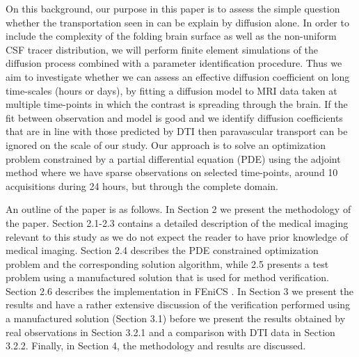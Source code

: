 \documentclass[12pt,a4paper]{article}
\begin{document}
On this background, our purpose in this paper is to assess the simple question whether the  
transportation seen in \cite{ringstad2018brain} can be explain by diffusion alone. In order
to include the complexity of the folding brain surface as well as the non-uniform CSF tracer distribution, we
will perform finite element simulations of the diffusion process combined with a parameter identification procedure. 
Thus we aim to investigate whether we can assess an effective diffusion coefficient on long time-scales (hours or days), by fitting a diffusion model to MRI data taken at multiple time-points in which the contrast is spreading through the brain. If the fit between observation and model is good and we identify diffusion coefficients that are 
in line with those predicted by DTI then paravascular transport can be ignored on the scale of our study. 
Our approach is to solve an optimization problem constrained by a partial differential equation (PDE) using the adjoint method where we have sparse observations on selected time-points, around 10 acquisitions during 24 hours, but through
the complete domain. 
%

An outline of the paper is as follows. 
In Section 2 we present the methodology of the paper. Section 2.1-2.3 contains a detailed description of the medical imaging 
relevant to this study as we do not expect the reader to have prior knowledge of medical imaging. Section 2.4
describes the PDE constrained optimization problem and the corresponding solution algorithm, while 2.5 presents
a test problem using a manufactured solution that is used for method verification. Section 2.6 describes the implementation 
in FEniCS \cite{LoggMardalEtAl2012a}. In Section 3 we present the results and have a rather extensive discussion of the verification performed
using a manufactured solution (Section 3.1) before we present the results obtained by real observations in Section 3.2.1    
and a comparison with DTI data in Section 3.2.2. Finally, in Section 4, the methodology and results are discussed.  
   
\end{document}
